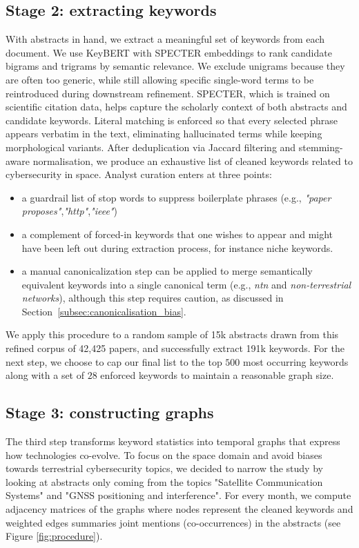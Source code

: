 \documentclass{article}
\begin{document}
\subsection{Stage 2: extracting keywords}
\label{keywordextraction}
With abstracts in hand, we extract a meaningful set of keywords from each document. We use KeyBERT with SPECTER embeddings to rank candidate bigrams and trigrams by semantic relevance. We exclude unigrams because they are often too generic, while still allowing specific single-word terms to be reintroduced during downstream refinement. SPECTER, which is trained on scientific citation data, helps capture the scholarly context of both abstracts and candidate keywords. Literal matching is enforced so that every selected phrase appears verbatim in the text, eliminating hallucinated terms while keeping morphological variants. After deduplication via Jaccard filtering and stemming-aware normalisation, we produce an exhaustive list of cleaned keywords related to cybersecurity in space. 
Analyst curation enters at three points:
\begin{itemize}
\item a guardrail list of stop words to suppress boilerplate phrases (e.g., \textit{"paper proposes"},\textit{"http"},\textit{"ieee"})
\item a complement of forced-in keywords that one wishes to appear and might have been left out during extraction process, for instance niche keywords.
\item a manual canonicalization step can be applied to merge semantically equivalent keywords into a single canonical term (e.g., \textit{ntn} and \textit{non-terrestrial networks}), although this step requires caution, as discussed in Section~\ref{subsec:canonicalisation_bias}.
\end{itemize}
We apply this procedure to a random sample of 15k abstracts drawn from this refined corpus of 42,425 papers, and successfully extract 191k keywords.
For the next step, we choose to cap our final list to the top $500$ most occurring keywords along with a set of $28$ enforced keywords to maintain a reasonable graph size.

\subsection{Stage 3: constructing graphs}

The third step transforms keyword statistics into temporal graphs that express how technologies co-evolve.
To focus on the space domain and avoid biases towards terrestrial cybersecurity topics, we decided to narrow the study by looking at abstracts only coming from the topics "Satellite Communication Systems" and "GNSS positioning and interference".
For every month, we compute adjacency matrices of the graphs where nodes represent the cleaned keywords and weighted edges summaries joint mentions (co-occurrences) in the abstracts (see Figure \ref{fig:procedure}).
\end{document}
